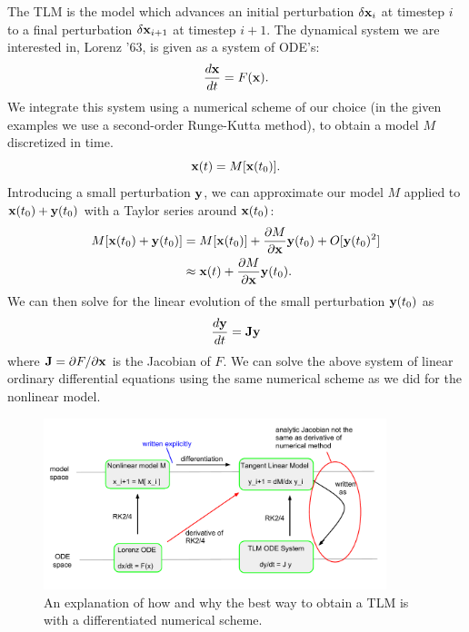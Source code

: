 \documentclass[12pt]{report}
\begin{document}
The TLM is the model which advances an initial perturbation $\delta \mathbf{x}_{i}$ at timestep $i$ to a final perturbation $\delta \mathbf{x}_{i+1}$ at timestep $i+1$.
The dynamical system we are interested in, Lorenz '63, is given as a system of ODE's:
\[ \frac{d\mathbf{x}}{dt} = F(\mathbf{x}) .\]
We integrate this system using a numerical scheme of our choice (in the given examples we use a second-order Runge-Kutta method), to obtain a model $M$ discretized in time.
\[ \mathbf{x}(t) = M[ \mathbf{x}(t_0) ] .\]
Introducing a small perturbation $\mathbf{y}$, we can approximate our model $M$ applied to $\mathbf{x}(t_0) + \mathbf{y}(t_0)$ with a Taylor series around $\mathbf{x}(t_0)$:
\begin{align*} M[ \mathbf{x}(t_0) + \mathbf{y}(t_0) ] &= M [ \mathbf{x}(t_0) ] + \frac{\partial M}{\partial \mathbf{x}} \mathbf{y}(t_0) + O [ \mathbf{y}(t_0) ^2 ]\\ &\approx \mathbf{x}(t) + \frac{\partial M}{\partial \mathbf{x}} \mathbf{y}(t_0) .\end{align*}
We can then solve for the linear evolution of the small perturbation $\mathbf{y}(t_0)$ as 
\begin{equation} \frac{d\mathbf{y} }{dt } = \mathbf{J} \mathbf{y} \label{eq:ODETLM} \end{equation}
where $\mathbf{J} = \partial F / \partial \mathbf{x}$ is the Jacobian of $F$.
We can solve the above system of linear ordinary differential equations using the same numerical scheme as we did for the nonlinear model.

\begin{figure}[h!]
  \centering
  \includegraphics[width=0.89\textwidth]{figures/TLM-explanation.pdf}
  \caption[An explanation of how and why the best way to obtain a TLM is with a differentiated numerical scheme]{
    An explanation of how and why the best way to obtain a TLM is with a differentiated numerical scheme.
  }
  \label{fig:TLMscheme}
\end{figure}
\end{document}

